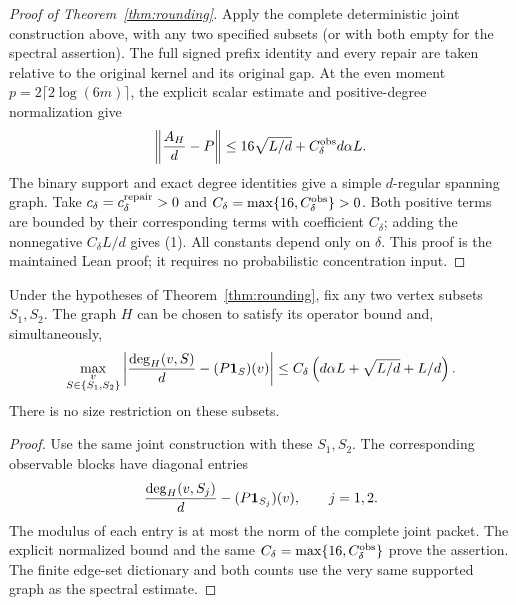 \begin{proof}[Proof of Theorem~\ref{thm:rounding}]
Apply the complete deterministic joint construction above, with any
two specified subsets (or with both empty for the spectral assertion).
The full signed prefix identity and every repair are taken relative
to the original kernel and its original gap.
At the even moment \(p=2\lceil2\log(6m)\rceil\), the explicit
scalar estimate and positive-degree normalization give
\[
 \left\|\frac{A_H}{d}-P\right\|
 \leq16\sqrt{L/d}+C_\delta^{\rm obs}d\alpha L.
\]
The binary support and exact degree identities give a simple
\(d\)-regular spanning graph.
Take \(c_\delta=c_\delta^{\rm repair}>0\) and
\(C_\delta=\max\{16,C_\delta^{\rm obs}\}>0\).
Both positive terms are bounded by their corresponding terms
with coefficient \(C_\delta\); adding the nonnegative \(C_\delta L/d\)
gives (1).
All constants depend only on \(\delta\).
This proof is the maintained Lean proof; it requires no probabilistic
concentration input.
\end{proof}

\begin{lemma}
\label{lem:observablerounding}
Under the hypotheses of Theorem~\ref{thm:rounding}, fix any
two vertex subsets \(S_1,S_2\).
The graph \(H\) can be chosen to satisfy its operator bound
and, simultaneously,
\[
 \max_{\substack{v\\S\in\{S_1,S_2\}}}
 \left|\frac{\deg_H(v,S)}d-(P\mathbf1_S)(v)\right|
 \leq C_\delta\left(d\alpha L+\sqrt{L/d}+L/d\right).
\]
There is no size restriction on these subsets.
\end{lemma}
\begin{proof}
Use the same joint construction with these \(S_1,S_2\).
The corresponding observable blocks have diagonal entries
\[
 \frac{\deg_H(v,S_j)}d-(P\mathbf1_{S_j})(v),\qquad j=1,2.
\]
The modulus of each entry is at most the norm of the complete
joint packet.
The explicit normalized bound and the same
\(C_\delta=\max\{16,C_\delta^{\rm obs}\}\) prove the assertion.
The finite edge-set dictionary and both counts use the very same
supported graph as the spectral estimate.
\end{proof}

